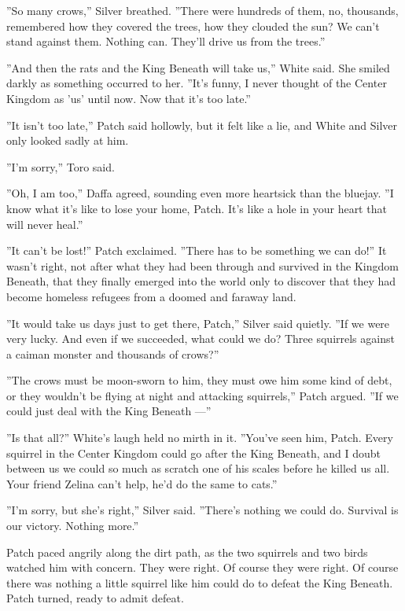 \documentclass[12pt]{book}
\begin{document}
''So many crows,'' Silver breathed. ''There were hundreds of them, no,
thousands, remembered how they covered the trees, how they clouded the
sun? We can't stand against them. Nothing can. They'll drive us from
the trees.''

''And then the rats and the King Beneath will take us,'' White
said. She smiled darkly as something occurred to her. ''It's funny, I
never thought of the Center Kingdom as 'us' until now. Now that it's
too late.''

''It isn't too late,'' Patch said hollowly, but it felt like a lie,
and White and Silver only looked sadly at him.

''I'm sorry,'' Toro said.

''Oh, I am too,'' Daffa agreed, sounding even more heartsick than the
bluejay. ''I know what it's like to lose your home, Patch. It's like a
hole in your heart that will never heal.''

''It can't be lost!'' Patch exclaimed. ''There has to be something we
can do!'' It wasn't right, not after what they had been through and
survived in the Kingdom Beneath, that they finally emerged into the
world only to discover that they had become homeless refugees from a
doomed and faraway land.

''It would take us days just to get there, Patch,'' Silver said
quietly. ''If we were very lucky. And even if we succeeded, what could
we do? Three squirrels against a caiman monster and thousands of
crows?''

''The crows must be moon-sworn to him, they must owe him some kind of
debt, or they wouldn't be flying at night and attacking squirrels,''
Patch argued. ''If we could just deal with the King Beneath ---''

''Is that all?'' White's laugh held no mirth in it. ''You've seen him,
Patch. Every squirrel in the Center Kingdom could go after the King
Beneath, and I doubt between us we could so much as scratch one of his
scales before he killed us all. Your friend Zelina can't help, he'd do
the same to cats.''

''I'm sorry, but she's right,'' Silver said. ''There's nothing we
could do. Survival is our victory. Nothing more.''

Patch paced angrily along the dirt path, as the two squirrels and two
birds watched him with concern. They were right. Of course they were
right. Of course there was nothing a little squirrel like him could do
to defeat the King Beneath. Patch turned, ready to admit defeat.
\end{document}
